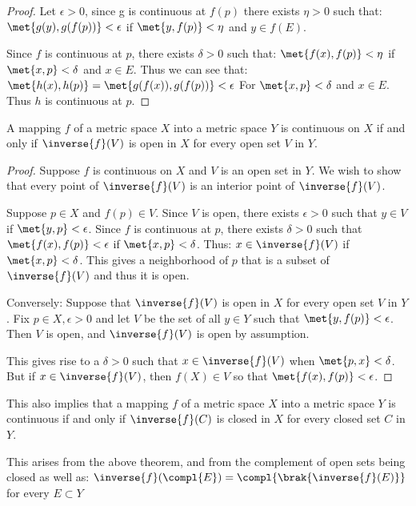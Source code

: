 \documentclass[12pt, letterpaper]{paper}
\begin{document}
\begin{proof}
  Let $\epsilon > 0$, since g is continuous at $f(p)$ there exists
  $\eta > 0$ such that: $\met{ g(y),g(f(p))} < \epsilon$ if
  $\met{y,f(p)} < \eta$ and $y \in f(E)$.

  Since $f$ is continuous at $p$, there exists $\delta > 0$ such that:
  $\met{f(x), f(p)} < \eta$ if $\met{x,p} < \delta$ and $x \in
  E$. Thus we can see that:
  $\met{h(x),h(p)} = \met{ g(f(x)), g(f(p)) } < \epsilon$ For
  $\met{x,p} < \delta$ and $x \in E$. Thus $h$ is continuous at $p$.
\end{proof}

\begin{theorem}
  \label{thr:4.8}
  A mapping $f$ of a metric space $X$ into a metric space $Y$ is
  continuous on $X$ if and only if $\inverse{f}(V)$ is open in $X$ for
  every open set $V$ in $Y$.
\end{theorem}

\begin{proof}
  Suppose $f$ is continuous on $X$ and $V$ is an open set in $Y$. We
  wish to show that every point of $\inverse{f}(V)$ is an interior
  point of $\inverse{f}(V)$.

  Suppose $p \in X$ and $f(p) \in V$. Since $V$ is open, there exists
  $\epsilon > 0$ such that $y \in V$ if $\met{y,p} < \epsilon$. Since
  $f$ is continuous at $p$, there exists $\delta > 0$ such that
  $\met{f(x), f(p)} < \epsilon$ if $\met{x,p} < \delta$. Thus:
  $x \in \inverse{f}(V)$ if $\met{x,p} < \delta$. This gives a
  neighborhood of $p$ that is a subset of $\inverse{f}(V)$ and thus it
  is open.

  Conversely: Suppose that $\inverse{f}(V)$ is open in $X$ for every
  open set $V$ in $Y$. Fix $p \in X, \epsilon > 0$ and let $V$ be the
  set of all $y \in Y$ such that $\met{y,f(p)} < \epsilon$. Then $V$
  is open, and $\inverse{f}(V)$ is open by assumption.

  This gives rise to a $\delta > 0$ such that $x \in \inverse{f}(V)$
  when $\met{p,x} < \delta$. But if $x \in \inverse{f}(V)$, then
  $f(X) \in V$ so that $\met{f(x),f(p)} < \epsilon$.
\end{proof}

This also implies that a mapping $f$ of a metric space $X$ into a
metric space $Y$ is continuous if and only if $\inverse{f}(C)$ is
closed in $X$ for every closed set $C$ in $Y$.

This arises from the above theorem, and from the complement of open
sets being closed as well as:
$\inverse{f}(\compl{ E }) = \compl{\brak{\inverse{f}(E)}}$ for every
$E \subset Y$
\end{document}
